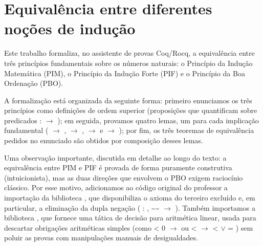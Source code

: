 \begin{coqdoccode}
\end{coqdoccode}
\section{Equivalência entre diferentes noções de indução}




    Este trabalho formaliza, no assistente de provas Coq/Rocq, a
    equivalência entre três princípios fundamentais sobre os números
    naturais: o Princípio da Indução Matemática (PIM), o Princípio da
    Indução Forte (PIF) e o Princípio da Boa Ordenação (PBO).


    A formalização está organizada da seguinte forma: primeiro
    enunciamos os três princípios como definições de ordem superior
    (proposições que quantificam sobre predicados :  \ensuremath{\rightarrow} );
    em seguida, provamos quatro lemas, um para cada implicação
    fundamental ( \ensuremath{\rightarrow} ,  \ensuremath{\rightarrow} ,  \ensuremath{\rightarrow}  e
     \ensuremath{\rightarrow} ); por fim, os três teoremas de equivalência pedidos
    no enunciado são obtidos por composição desses lemas.


    Uma observação importante, discutida em detalhe ao longo do
    texto: a equivalência entre PIM e PIF é provada de forma
    puramente construtiva (intuicionista), mas as duas direções que
    envolvem o PBO exigem raciocínio clássico. Por esse motivo,
    adicionamos ao código original do professor a importação da
    biblioteca , que disponibiliza o axioma do terceiro
    excluído e, em particular, a eliminação da dupla negação
    ( : \coqdockw{\ensuremath{\forall}} , \~{}\~{} \ensuremath{\rightarrow} ). Também importamos a biblioteca
    , que fornece uma tática de decisão para aritmética linear,
    usada para descartar obrigações aritméticas simples (como
     < 0 \ensuremath{\rightarrow}  ou  <   \ensuremath{\rightarrow}  <  \ensuremath{\lor}  = ) sem poluir as
    provas com manipulações manuais de desigualdades. 
\begin{coqdoccode}
\coqdocemptyline
\coqdocemptyline
\end{coqdoccode}
